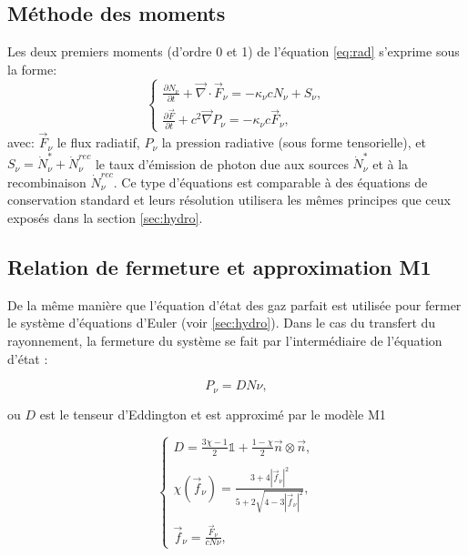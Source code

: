 \subsection{Méthode des moments}
Les deux premiers moments (d'ordre 0 et 1) de l'équation \ref{eq:rad} s'exprime sous la forme:
\begin{equation}
\begin{cases}
\frac{ \partial N_\nu }{ \partial t } + \vec{\nabla} \cdot \vec{F}_\nu = -\kappa_\nu c  N_\nu + S_\nu,\\
\frac{ \partial \vec{F} }{ \partial t } + c^2 \vec{\nabla} P_\nu = -\kappa_\nu c \vec{F}_\nu ,
\end{cases}
\label{eq:densite_energie}
\end{equation}
avec:
$\vec{F}_\nu$ le flux radiatif, 
$P_\nu $ la pression radiative (sous forme tensorielle),
et $S_\nu = \dot{N}_\nu^* + \dot{N}_\nu^{rec}$ le taux d’émission de photon due aux sources $\dot{N}_\nu^*$ et à la recombinaison $ \dot{N}_\nu^{rec}$.
Ce type d'équations est comparable à des équations de conservation standard et leurs résolution utilisera les mêmes principes que ceux exposés dans la section \ref{sec:hydro}.



\subsection{Relation de fermeture et approximation M1}

De la même manière que l'équation d'état des gaz parfait est utilisée pour fermer le système d'équations d'Euler (voir \ref{sec:hydro}).
Dans le cas du transfert du rayonnement, la fermeture du système se fait par l'intermédiaire de l’équation d’état :

\begin{equation}
 P_\nu = D N\nu ,
\label{eq:fermeture}
\end{equation}

ou $D$ est le tenseur d’Eddington et est approximé par le modèle M1 \citep{levermore_relating_1984}%

\begin{equation}
\begin{cases}

D = \frac{ 3\chi -1 }{2} \mathbb{1} + \frac{ 1 - \chi }{2} \vec{n} \otimes \vec{n} , \\
\\
\chi(\vec{f}_\nu) = \frac{ 3+4 |\vec{f}_\nu|^2 }{5+2\sqrt{4-3|\vec{f}_\nu|^2}} , \\
\\
\vec{f}_\nu = \frac{ \vec{F}_\nu }{c N\nu }  ,

\end{cases}
\label{eq:tenseur}
\end{equation}


